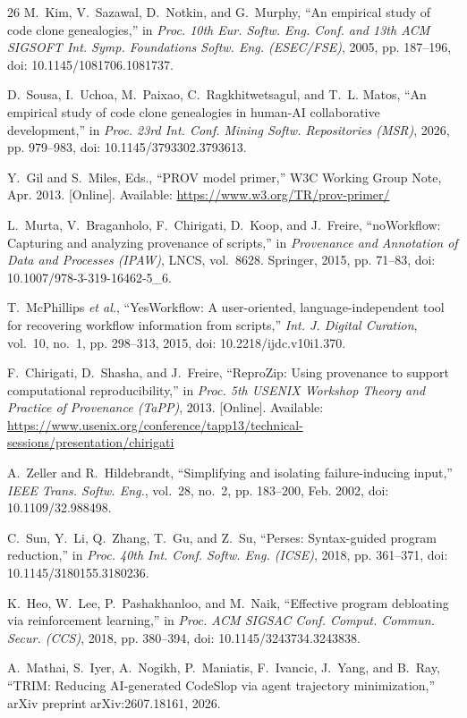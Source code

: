 \documentclass[10pt,conference]{IEEEtran}
\begin{document}
\begin{thebibliography}{26}
M.~Kim, V.~Sazawal, D.~Notkin, and G.~Murphy, ``An empirical study of code clone genealogies,'' in \emph{Proc. 10th Eur. Softw. Eng. Conf. and 13th ACM SIGSOFT Int. Symp. Foundations Softw. Eng. (ESEC/FSE)}, 2005, pp. 187--196, doi: 10.1145/1081706.1081737.

D.~Sousa, I.~Uchoa, M.~Paixao, C.~Ragkhitwetsagul, and T.~L. Matos, ``An empirical study of code clone genealogies in human-AI collaborative development,'' in \emph{Proc. 23rd Int. Conf. Mining Softw. Repositories (MSR)}, 2026, pp. 979--983, doi: 10.1145/3793302.3793613.

Y.~Gil and S.~Miles, Eds., ``PROV model primer,'' W3C Working Group Note, Apr. 2013. [Online]. Available: \url{https://www.w3.org/TR/prov-primer/}

L.~Murta, V.~Braganholo, F.~Chirigati, D.~Koop, and J.~Freire, ``noWorkflow: Capturing and analyzing provenance of scripts,'' in \emph{Provenance and Annotation of Data and Processes (IPAW)}, LNCS, vol.~8628. Springer, 2015, pp. 71--83, doi: 10.1007/978-3-319-16462-5\_6.

T.~McPhillips \emph{et al.}, ``YesWorkflow: A user-oriented, language-independent tool for recovering workflow information from scripts,'' \emph{Int. J. Digital Curation}, vol.~10, no.~1, pp. 298--313, 2015, doi: 10.2218/ijdc.v10i1.370.

F.~Chirigati, D.~Shasha, and J.~Freire, ``ReproZip: Using provenance to support computational reproducibility,'' in \emph{Proc. 5th USENIX Workshop Theory and Practice of Provenance (TaPP)}, 2013. [Online]. Available: \url{https://www.usenix.org/conference/tapp13/technical-sessions/presentation/chirigati}

A.~Zeller and R.~Hildebrandt, ``Simplifying and isolating failure-inducing input,'' \emph{IEEE Trans. Softw. Eng.}, vol.~28, no.~2, pp. 183--200, Feb. 2002, doi: 10.1109/32.988498.

C.~Sun, Y.~Li, Q.~Zhang, T.~Gu, and Z.~Su, ``Perses: Syntax-guided program reduction,'' in \emph{Proc. 40th Int. Conf. Softw. Eng. (ICSE)}, 2018, pp. 361--371, doi: 10.1145/3180155.3180236.

K.~Heo, W.~Lee, P.~Pashakhanloo, and M.~Naik, ``Effective program debloating via reinforcement learning,'' in \emph{Proc. ACM SIGSAC Conf. Comput. Commun. Secur. (CCS)}, 2018, pp. 380--394, doi: 10.1145/3243734.3243838.

A.~Mathai, S.~Iyer, A.~Nogikh, P.~Maniatis, F.~Ivancic, J.~Yang, and B.~Ray, ``TRIM: Reducing AI-generated CodeSlop via agent trajectory minimization,'' arXiv preprint arXiv:2607.18161, 2026.

\end{thebibliography}
\end{document}
